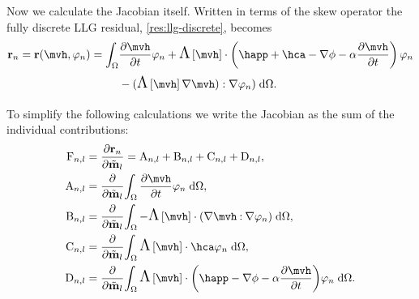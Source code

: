 {%

Now we calculate the Jacobian itself.
Written in terms of the skew operator the fully discrete LLG residual, \cref{res:llg-discrete}, becomes
\begin{equation}
  \begin{aligned}
    \rllgv_n = \rllgv(\mvh, \tbf_n) = \int_{\magd}
    & \dmdth \tbf_n + \skewm{\mvh} \cdot \left( \happ + \hca - \grad \phim - \dampc \dmdth
    \right) \tbf_n \\
    &- (\skewm{\mvh} \grad \mvh) : \grad \tbf_n)
    \d\magd.
  \end{aligned}
\end{equation}

To simplify the following calculations we write the Jacobian as the sum of the individual contributions:
\begin{equation}
  \begin{aligned}
    \Fm_{n,l} &= \pd{\rllgv_n}{\mvdis_l} = \Am_{n,l} + \Bm_{n,l} + \Cm_{n,l} + \Dm_{n,l}, \\
    \Am_{n,l} &= \pd{}{\mvdis_l} \intd{\dmdth \tbf_n}, \\
    \Bm_{n,l} &= \pd{}{\mvdis_l} \intd{- \skewm{\mvh} \cdot (\grad \mvh \compdot \grad \tbf_n)}, \\
    \Cm_{n,l} &= \pd{}{\mvdis_l} \intd{ \skewm{\mvh} \cdot \hca  \tbf_n}, \\
    \Dm_{n,l} &= \pd{}{\mvdis_l} \intd{  \skewm{\mvh} \cdot \bigb{ \happ - \grad \phim - \dampc \dmdth} \tbf_n}.
  \end{aligned}
\end{equation}

}
